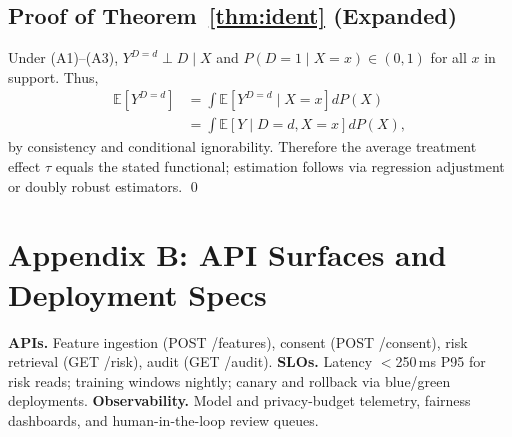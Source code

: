 \documentclass[conference]{IEEEtran}
\theoremstyle{plain}
\theoremstyle{remark}
\begin{document}
\subsection*{Proof of Theorem~\ref{thm:ident} (Expanded)}
Under (A1)--(A3), $Y^{D=d} \perp D \mid X$ and $P(D{=}1\mid X{=}x)\in(0,1)$ for all $x$ in support. Thus,
\begin{align*}
\mathbb{E}[Y^{D=d}] &= \int \mathbb{E}[Y^{D=d}\mid X{=}x] dP(X)\\
&= \int \mathbb{E}[Y \mid D{=}d, X{=}x] dP(X),
\end{align*}
by consistency and conditional ignorability. Therefore the average treatment effect $\tau$ equals the stated functional; estimation follows via regression adjustment or doubly robust estimators.
\qed

\section*{Appendix B: API Surfaces and Deployment Specs}
\textbf{APIs.} Feature ingestion (POST /features), consent (POST /consent), risk retrieval (GET /risk), audit (GET /audit). \textbf{SLOs.} Latency $<$250\,ms P95 for risk reads; training windows nightly; canary and rollback via blue/green deployments. \textbf{Observability.} Model and privacy-budget telemetry, fairness dashboards, and human-in-the-loop review queues.
\end{document}
